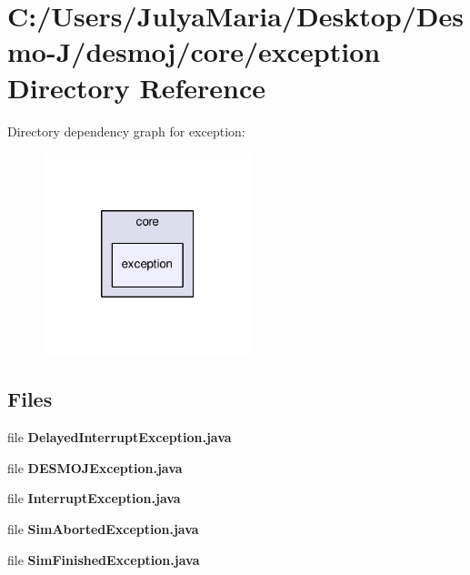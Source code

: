 \section{C\-:/\-Users/\-Julya\-Maria/\-Desktop/\-Desmo-\/\-J/desmoj/core/exception Directory Reference}
\label{dir_06532f1c7c5d9066ba2504a203d76eb8}
Directory dependency graph for exception\-:
\nopagebreak
\begin{figure}[H]
\begin{center}
\leavevmode
\includegraphics[width=172pt]{dir_06532f1c7c5d9066ba2504a203d76eb8_dep}
\end{center}
\end{figure}
\subsection*{Files}
\begin{DoxyCompactItemize}
\item 
file {\bfseries Delayed\-Interrupt\-Exception.\-java}
\item 
file {\bfseries D\-E\-S\-M\-O\-J\-Exception.\-java}
\item 
file {\bfseries Interrupt\-Exception.\-java}
\item 
file {\bfseries Sim\-Aborted\-Exception.\-java}
\item 
file {\bfseries Sim\-Finished\-Exception.\-java}
\end{DoxyCompactItemize}
